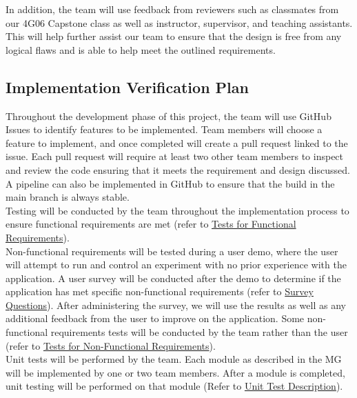 \documentclass[12pt, titlepage]{article}
\begin{document}
\noindent  In addition, the team will use feedback from reviewers such as classmates from our 4G06 Capstone class as well
as instructor, supervisor, and teaching assistants. This will help further assist our team to ensure that the design is free from 
any logical flaws and is able to help meet the outlined requirements. 




\subsection{Implementation Verification Plan}


Throughout the development phase of this project, the team will use GitHub Issues to identify features to be implemented. Team members will choose a feature to implement, and once completed will create a pull request linked to the issue. Each pull request will require at least two other team members to inspect and review the code ensuring that it meets the requirement and design discussed. A pipeline can also be implemented in GitHub to ensure that the build in the main branch is always stable. \\

\noindent Testing will be conducted by the team throughout the implementation process to ensure functional requirements are met (refer to \hyperref[FR-T]{Tests for Functional Requirements}).\\

\noindent Non-functional requirements will be tested during a user demo, where the user will attempt to run and control an experiment with no prior experience with the application. A user survey will be conducted after the demo to determine if the application has met specific non-functional requirements (refer to \hyperref[SQ]{Survey Questions}). After administering the survey, we will use the results as well as any additional feedback from the user to improve on the application. Some non-functional requirements tests will be conducted by the team rather than the user (refer to \hyperref[NF-T]{Tests for Non-Functional Requirements}).\\

\noindent Unit tests will be performed by the team. Each module as described in the MG will be implemented by one or two team members. After a module is completed, unit testing will be performed on that module (Refer to \hyperref[UTD]{Unit Test Description}).\\
\end{document}
